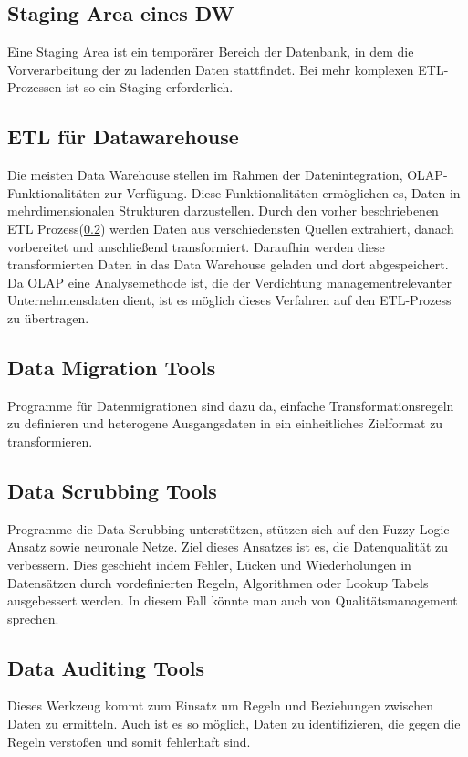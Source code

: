 \subsection{Staging Area eines DW}\label{ssec:Staging-Area}
Eine Staging Area ist ein temporärer Bereich der Datenbank, in dem die Vorverarbeitung der zu ladenden Daten stattfindet. Bei mehr komplexen ETL-Prozessen ist so ein Staging erforderlich.
\subsection{ETL für Datawarehouse}\label{ssec:ETL-DW}
Die meisten Data Warehouse stellen im Rahmen der Datenintegration, OLAP-Funktionalitäten zur Verfügung. Diese Funktionalitäten ermöglichen es, Daten in mehrdimensionalen Strukturen darzustellen. Durch den vorher beschriebenen ETL Prozess(\ref{ssec:ETL-DW}) werden Daten aus verschiedensten Quellen extrahiert, danach vorbereitet und anschließend transformiert. Daraufhin werden diese transformierten Daten in das Data Warehouse geladen und dort abgespeichert. Da OLAP eine Analysemethode ist, die der Verdichtung managementrelevanter Unternehmensdaten dient, ist es möglich dieses Verfahren auf den ETL-Prozess zu übertragen.
\subsection{Data Migration Tools}\label{ssec:Data-Migration}
Programme für Datenmigrationen sind dazu da, einfache Transformationsregeln zu definieren und heterogene Ausgangsdaten in ein einheitliches Zielformat zu transformieren.
\subsection{Data Scrubbing Tools}\label{ssec:Data-Scrubbing}
Programme die Data Scrubbing unterstützen, stützen sich auf den Fuzzy Logic Ansatz sowie neuronale Netze. Ziel dieses Ansatzes ist es, die Datenqualität zu verbessern. Dies geschieht indem Fehler, Lücken und Wiederholungen in Datensätzen durch vordefinierten Regeln, Algorithmen oder Lookup Tabels ausgebessert werden. In diesem Fall könnte man auch von Qualitätsmanagement sprechen.
\subsection{Data Auditing Tools}\label{ssec:Data-Auditing}
Dieses Werkzeug kommt zum Einsatz um Regeln und Beziehungen zwischen Daten zu ermitteln. Auch ist es so möglich, Daten zu identifizieren, die gegen die Regeln verstoßen und somit fehlerhaft sind.
\newpage
